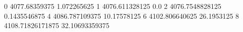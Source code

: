 0 4077.68359375 1.072265625
1 4076.611328125 0.0
2 4076.7548828125 0.1435546875
4 4086.787109375 10.17578125
6 4102.806640625 26.1953125
8 4108.71826171875 32.10693359375
